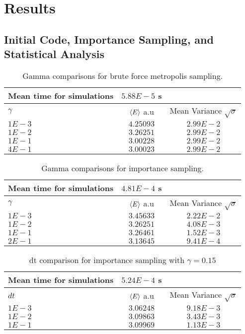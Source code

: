 \section{Results}
\subsection{Initial Code, Importance Sampling, and Statistical Analysis}
\begin{table}
\begin{tabular}{l|c|c}
	Mean time for simulations & $5.88E-5$ s & \\
	\hline
	$\gamma$ & $\langle E \rangle$ a.u & Mean Variance $\sqrt{\sigma}$\\
	\hline
	$1E-3$ & $4.25093$ & $2.99E-2$ \\
	$1E-2$ & $3.26251$ & $2.99E-2$ \\
	$1E-1$ & $3.00228$ & $2.99E-2$ \\
	$4E-1$ & $3.00023$ & $2.99E-2$ \\
\end{tabular}
\label{tab:naive-nin}
\caption{Gamma comparisons for brute force metropolis sampling.}
\end{table}

\begin{table}
\begin{tabular}{l|c|c}
	Mean time for simulations & $4.81E-4$ s & \\
	\hline
	$\gamma$ & $\langle E \rangle$ a.u & Mean Variance $\sqrt{\sigma}$\\
	\hline
	$1E-3$ & $3.45633$ & $2.22E-2$ \\
	$1E-2$ & $3.26251$ & $4.08E-3$ \\
	$1E-1$ & $3.26461$ & $1.52E-3$ \\
	$2E-1$ & $3.13645$ & $9.41E-4$ \\
\end{tabular}
\label{tab:importance-nin-gamma}
\caption{Gamma comparisons for importance sampling.}
\end{table}

\begin{table}
\begin{tabular}{l|c|c}
	Mean time for simulations & $5.24E-4$ s & \\
	\hline
	$dt$ & $\langle E \rangle$ a.u & Mean Variance $\sqrt{\sigma}$\\
	\hline
	$1E-3$ & $3.06248$ & $9.18E-3$ \\
	$1E-2$ & $3.09863$ & $3.43E-3$ \\
	$1E-1$ & $3.09969$ & $1.13E-3$ \\
\end{tabular}
\label{tab:importance-nin-dt}
\caption{dt comparison for importance sampling with $\gamma = 0.15$}
\end{table}

